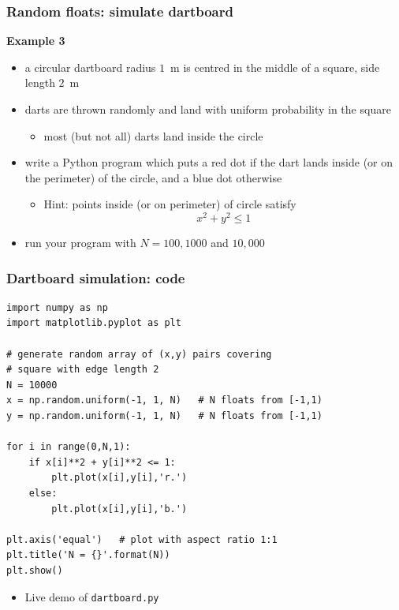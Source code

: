 \documentclass[english,14pt]{beamer}
\newcommand\red[1]{{\color{red} #1}}
\newcommand\blue[1]{{\color{blue} #1}}
\begin{document}

\begin{frame}[fragile]

\frametitle{Random floats: simulate dartboard}

\textbf{Example 3}\\
\vspace*{1mm}
\begin{itemize}
	\item a circular dartboard radius $1$~m is centred in the middle of a square, side length $2$~m
	\item darts are thrown randomly and land with uniform probability in the square
	\begin{itemize}
		\item most (but not all) darts land inside the circle
	\end{itemize}
	\pause
	\item write a Python program which puts a \red{red} dot if the dart lands inside (or on the perimeter) of the circle, and a \blue{blue} dot otherwise
	\begin{itemize}
		\item Hint: points inside (or on perimeter) of circle satisfy
			\[
			x^2 + y^2 \leq 1
			\]
		\end{itemize}
	\item run your program with $N=100, 1000$ and $10,000$
\end{itemize}

\end{frame}


\begin{frame}[fragile]

\frametitle{Dartboard simulation: code}
\begin{lstlisting}[style=CStyle,basicstyle=\scriptsize]
import numpy as np
import matplotlib.pyplot as plt

# generate random array of (x,y) pairs covering
# square with edge length 2
N = 10000
x = np.random.uniform(-1, 1, N)   # N floats from [-1,1)
y = np.random.uniform(-1, 1, N)   # N floats from [-1,1)

for i in range(0,N,1):
    if x[i]**2 + y[i]**2 <= 1:
        plt.plot(x[i],y[i],'r.')
    else:
        plt.plot(x[i],y[i],'b.')

plt.axis('equal')   # plot with aspect ratio 1:1
plt.title('N = {}'.format(N))
plt.show()
\end{lstlisting}
\vspace*{-3mm}
\begin{itemize}
	\item Live demo of \texttt{dartboard.py}
\end{itemize}
\end{frame}
\end{document}
